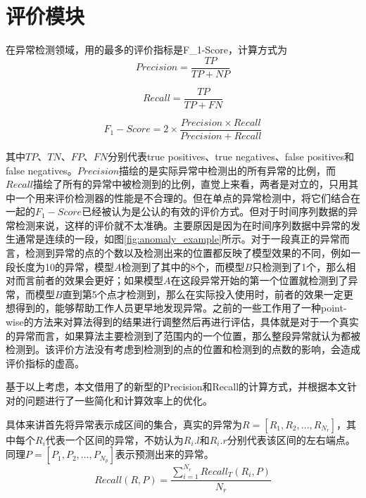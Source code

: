\section{评价模块}
在异常检测领域，用的最多的评价指标是F\_1-Score，计算方式为
\begin{equation*}
  Precision = \frac{TP}{TP + NP}
\end{equation*}

\begin{equation*}
  Recall = \frac{TP}{TP + FN}
\end{equation*}

\begin{equation*}
  F_1-Score = 2\times \frac { Precision \times Recall}{Precision + Recall}
\end{equation*}

其中$TP$、$TN$、$FP$、$FN$分别代表true positives、true negatives、false positives和 false negatives。$Precision$描绘的是实际异常中检测出的所有异常的比例，而$Recall$描绘了所有的异常中被检测到的比例，直觉上来看，两者是对立的，只用其中一个用来评价检测器的性能是不合理的。但在单点的异常检测中，将它们结合在一起的$F_1-Score$已经被认为是公认的有效的评价方式。但对于时间序列数据的异常检测来说，这样的评价就不太准确。主要原因是因为在时间序列数据中异常的发生通常是连续的一段，如图\ref{fig:anomaly_example}所示。对于一段真正的异常而言，检测到异常的点的个数以及检测出来的位置都反映了模型效果的不同，例如一段长度为10的异常，模型$A$检测到了其中的8个，而模型$B$只检测到了1个，那么相对而言前者的效果会更好；如果模型$A$在这段异常开始的第一个位置就检测到了异常，而模型$B$直到第5个点才检测到，那么在实际投入使用时，前者的效果一定更想得到的，能够帮助工作人员更早地发现异常。之前的一些工作\cite{xu2018unsupervised}\cite{su2019robust}用了一种point-wise的方法来对算法得到的结果进行调整然后再进行评估，具体就是对于一个真实的异常而言，如果算法主要检测到了范围内的一个位置，那么整段异常就认为都被检测到。该评价方法没有考虑到检测到的点的位置和检测到的点数的影响，会造成评价指标的虚高。

基于以上考虑，本文借用了\cite{tatbul2018precision}的新型的Precision和Recall的计算方式，并根据本文针对的问题进行了一些简化和计算效率上的优化。

具体来讲首先将异常表示成区间的集合，真实的异常为$R=[R_1,R_2,\dots,R_{N_r}]$，其中每个$R_i$代表一个区间的异常，不妨认为$R_i.l$和$R_i.r$分别代表该区间的左右端点。同理$P=[P_1,P_2,\dots,P_{N_p}]$表示预测出来的异常。
\begin{equation*}
  Recall(R,P) = \frac{\sum_{i=1}^{N_r} Recall_T(R_i,P)}{N_r}
\end{equation*}

